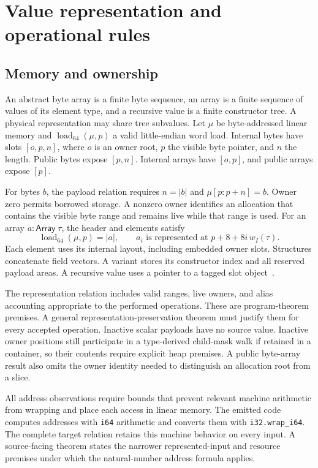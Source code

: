 \documentclass[11pt]{article}
\newcommand{\code}[1]{\texttt{#1}}
\newcommand{\ty}[1]{\mathsf{#1}}
\begin{document}
\section{Value representation and operational rules}

\subsection{Memory and ownership}

An abstract byte array is a finite byte sequence, an array is a finite sequence of values of its element type, and a recursive value is a finite constructor tree.  A physical representation may share tree subvalues.  Let $\mu$ be byte-addressed linear memory and $\operatorname{load}_{64}(\mu,p)$ a valid little-endian word load.  Internal bytes have slots $[o,p,n]$, where $o$ is an owner root, $p$ the visible byte pointer, and $n$ the length.  Public bytes expose $[p,n]$.  Internal arrays have $[o,p]$, and public arrays expose $[p]$.

For bytes $b$, the payload relation requires $n=|b|$ and $\mu[p:p+n]=b$.  Owner zero permits borrowed storage.  A nonzero owner identifies an allocation that contains the visible byte range and remains live while that range is used.  For an array $a:\ty{Array}\;\tau$, the header and elements satisfy
\[
\operatorname{load}_{64}(\mu,p)=|a|,
\qquad
a_i\text{ is represented at }p+8+8i\,w_I(\tau).
\]
Each element uses its internal layout, including embedded owner slots.  Structures concatenate field vectors.  A variant stores its constructor index and all reserved payload areas.  A recursive value uses a pointer to a tagged slot object~\cite{storage,values,binary}.

The representation relation includes valid ranges, live owners, and alias accounting appropriate to the performed operations.  These are program-theorem premises.  A general representation-preservation theorem must justify them for every accepted operation.  Inactive scalar payloads have no source value.  Inactive owner positions still participate in a type-derived child-mask walk if retained in a container, so their contents require explicit heap premises.  A public byte-array result also omits the owner identity needed to distinguish an allocation root from a slice.

All address observations require bounds that prevent relevant machine arithmetic from wrapping and place each access in linear memory.  The emitted code computes addresses with \code{i64} arithmetic and converts them with \code{i32.wrap\_i64}.  The complete target relation retains this machine behavior on every input.  A source-facing theorem states the narrower represented-input and resource premises under which the natural-number address formula applies.
\end{document}
